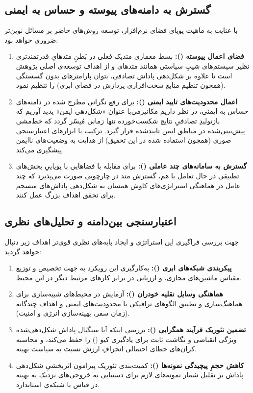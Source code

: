 \documentclass[oneside,openany,phd]{TMU-Thesis}
\begin{document}
\subsection{گسترش به دامنه‌های پیوسته و حساس به ایمنی}

با عنایت به ماهیت پویای فضای نرم‌افزار، توسعه روش‌های حاضر بر مسائل نوین‌تر ضروری خواهد بود:
\begin{enumerate}
  \item \textbf{فضای اعمال پیوسته ():} بسط معماری متدیک فعلی در بَطنِ متدهایِ قدرتمندتری نظیر سیستم‌های شیبِ سیاستی همانند متدهای  و  از اهداف توسعه‌ی اصلی پژوهش است تا علاوه بر شکل‌دهی پاداش تصادفی، بتوان پارامترهای بدون گسستگی (همچون تنظیم منابع سخت‌افزاری پردازش در فضای ابری) را تنظیم نمود.
  \item \textbf{اعمال محدودیت‌های تایید ایمنی ():} برای رفع نگرانی مطرح شده در دامنه‌های حساس به ایمنی، در نظر داریم مکانیزمی‌با عنوان «شکل‌دهی ایمن» پدید آوریم که بازتولیدِ تصادفیِ نتایج شکست‌خورده تنها زمانی مُیسّر گردد که خط‌مشی پیش‌بینی‌شده در مناطق ایمن تاییدشده قرار گیرد. ترکیب با ابزارهای اعتبارسنجی صوری (همچون  استفاده شده در این تحقیق) از هدایت به وضعیت‌های ناایمن پیشگیری می‌کند.
  \item \textbf{گسترش به سامانه‌های چند عاملی ():} برای مقابله با فضاهایی با پویاییِ بخش‌های تطبیقی در حال تعامل با هم، گسترش متد در چارچوبی صورت می‌پذیرد که چند عامل در هماهنگی استراتژی‌های کاوش همسان به شکل‌دهی پاداش‌های منسجم برای تحقق اهداف بزرگ عمل کنند.
\end{enumerate}

\subsection{اعتبارسنجی بین‌دامنه و تحلیل‌های نظری}

جهت بررسی فراگیری این استراتژی و ایجاد پایه‌های نظری قوی‌تر اهداف زیر دنبال خواهد گردید:
\begin{enumerate}
  \item \textbf{پیکر‌بندی شبکه‌های ابری ():} به‌کارگیری این رویکرد به جهت تخصیص و توزیع مقیاس ماشین‌های مجازی، و ارزیابی در برابر کارهای مرتبط دیگر در این محیط.
  \item \textbf{هماهنگی وسایل نقلیه خودران ():} آزمایش در محیط‌های شبیه‌سازی برای هماهنگ‌سازی و تطبیق الگوهای ترافیکی با محدودیت‌های ایمنی و اهداف چندگانه (زمان سفر، بهینه‌سازی انرژی و امنیت).
  \item \textbf{تضمین تئوریک فرآیند همگرایی ():} بررسی اینکه آیا سیگنال پاداش شکل‌دهی‌شده ویژگی انقباضی و نگاشت ثابت برای یادگیری کیو () را حفظ می‌کند، و محاسبه کران‌های خطای احتمالی انحرافِ ارزش  نسبت به سیاست بهینه.
  \item \textbf{کاهش حجمِ پیچیدگی نمونه‌ها ():} کمیت‌بندی تئوریک پیرامون اثربخشیِ شکل‌دهی پاداش بر تقلیل شمار نمونه‌های لازم برای دستیابی به خروجی‌های نزدیک به بهینه در قیاس با شبکه‌ی  استاندارد.
\end{enumerate}
\end{document}
